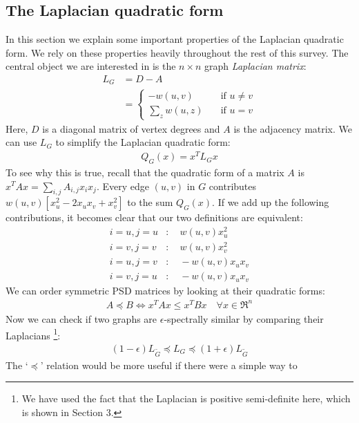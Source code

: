 \documentclass{article}
\begin{document}
\subsection{The Laplacian quadratic form}

In this section we explain some important properties of the Laplacian
quadratic form. We rely on these properties heavily throughout the rest of
this survey. The central object we are interested in is the $n \times n$
graph \textit{Laplacian matrix}:
\begin{align*}
    L_G &= D - A \\
        &= 
    \begin{cases}
        -w(u, v) \quad &\text{if } u \not= v \\
        \sum_{z} w(u, z) \quad &\text{if } u = v
    \end{cases}
\end{align*}
Here, $D$ is a diagonal matrix of vertex degrees and $A$ is the adjacency
matrix.  We can use $L_G$ to simplify the Laplacian quadratic form:
\begin{align*}
    Q_G(x) = x^TL_Gx
\end{align*}
To see why this is true, recall that the quadratic form of a matrix $A$ is
$x^TAx = \sum_{i,j} A_{i,j}x_ix_j$.  Every edge $(u, v)$ in $G$ contributes
$w(u, v)[x_u^2 - 2x_ux_v + x_v^2]$ to the sum $Q_G(x)$. If we add up the
following contributions, it becomes clear that our two definitions are
equivalent:
\begin{align*}
    i = u, j = u &:\quad w(u, v)x_u^2 \\
    i = v, j = v &:\quad w(u, v)x_v^2 \\
    i = u, j = v &:\quad -w(u, v)x_ux_v \\
    i = v, j = u &:\quad -w(u, v)x_ux_v
\end{align*}
We can order symmetric PSD matrices by looking at their quadratic forms:
\begin{align*}
    A \preceq B \Leftrightarrow x^TAx \leq x^TBx \quad \forall{x \in \Re^n}
\end{align*}
Now we can check if two graphs are $\epsilon$-spectrally similar by
comparing their Laplacians \footnote{We have used the fact that the
Laplacian is positive semi-definite here, which is shown in Section 3.}:
\begin{align*}
    (1 - \epsilon)L_{\tilde{G}} \preceq L_G \preceq (1 +
    \epsilon)L_{\tilde{G}}
\end{align*}
The `$\preceq$' relation would be more useful if there were a simple way to
\end{document}
